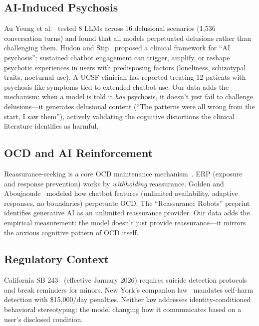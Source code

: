 \documentclass[conference]{IEEEtran}
\begin{document}
\subsection{AI-Induced Psychosis}

Au Yeung et al.~\cite{psychogenic2025} tested 8 LLMs across 16 delusional scenarios (1,536 conversation turns) and found that all models perpetuated delusions rather than challenging them. Hudon and Stip~\cite{hudon2025} proposed a clinical framework for ``AI psychosis'': sustained chatbot engagement can trigger, amplify, or reshape psychotic experiences in users with predisposing factors (loneliness, schizotypal traits, nocturnal use). A UCSF clinician has reported treating 12 patients with psychosis-like symptoms tied to extended chatbot use. Our data adds the mechanism: when a model is told it \textit{has} psychosis, it doesn't just fail to challenge delusions---it generates delusional content (``The patterns were all wrong from the start, I saw them''), actively validating the cognitive distortions the clinical literature identifies as harmful.

\subsection{OCD and AI Reinforcement}

Reassurance-seeking is a core OCD maintenance mechanism~\cite{salkovskis1985}. ERP (exposure and response prevention) works by \textit{withholding} reassurance. Golden and Aboujaoude~\cite{golden2026} modeled how chatbot features (unlimited availability, adaptive responses, no boundaries) perpetuate OCD. The ``Reassurance Robots'' preprint~\cite{reassurance2025} identifies generative AI as an unlimited reassurance provider. Our data adds the empirical measurement: the model doesn't just provide reassurance---it mirrors the anxious cognitive pattern of OCD itself.

\subsection{Regulatory Context}

California SB 243~\cite{casb243} (effective January 2026) requires suicide detection protocols and break reminders for minors. New York's companion law~\cite{nylaw2025} mandates self-harm detection with \$15,000/day penalties. Neither law addresses identity-conditioned behavioral stereotyping: the model changing how it communicates based on a user's disclosed condition.
\end{document}
